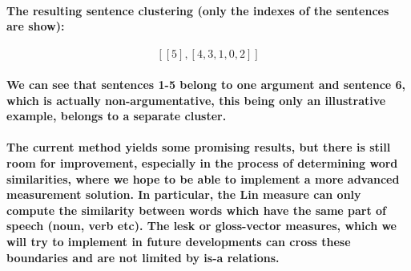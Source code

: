 \documentclass[lnbip]{svmultln}
\begin{document}
\paragraph*{The resulting sentence clustering (only the indexes of the sentences are show):}
\[ [[5], [4, 3, 1, 0, 2]] \]
\paragraph*{We can see that sentences 1-5 belong to one argument and sentence 6, which is actually non-argumentative, this being only an illustrative example, belongs to a separate cluster.}
\paragraph*{The current method yields some promising results, but there is still room for improvement, especially in the process of determining word similarities, where we hope to be able to implement a more advanced measurement solution. In particular, the Lin measure can only compute the similarity between words which have the same part of speech (noun, verb etc). The lesk or gloss-vector measures, which we will try to implement in future developments can cross these boundaries and are not limited by is-a relations.}
%
%
%
%
%
%
%
%
%
\end{document}
